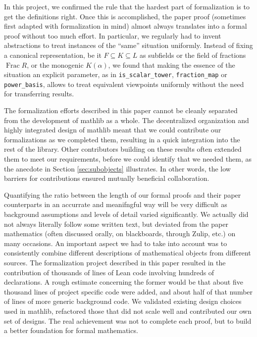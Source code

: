 \documentclass[a4paper,USenglish,cleveref, autoref, thm-restate]{lipics-v2021}
\newcommand{\lean}[1]{\texttt{#1}\xspace}
\newcommand{\mathlib}{\textsf{mathlib}\xspace}
\DeclareMathOperator{\Frac}{Frac}
\begin{document}
In this project, we confirmed the rule that the hardest part of formalization is to get the definitions right.
Once this is accomplished, the paper proof (sometimes first adapted with formalization in mind) almost always translates into a formal proof without too much effort.
In particular, we regularly had to invent abstractions to treat instances of the ``same'' situation uniformly.
Instead of fixing a canonical representation, be it $F \subseteq K \subseteq L$ as subfields or the field of fractions $\Frac R$, or the monogenic $K(\alpha)$, we found that making the essence of the situation an explicit parameter, as in \lean{is\_scalar\_tower}, \lean{fraction\_map} or \lean{power\_basis},
allows to treat equivalent viewpoints uniformly without the need for transferring results.

The formalization efforts described in this paper cannot be cleanly separated from the development of \mathlib as a whole.
The decentralized organization and highly integrated design of \mathlib meant that we could contribute our formalizations as we completed them, resulting in a quick integration into the rest of the library.
Other contributors building on these results often extended them to meet our requirements,
before we could identify that we needed them, as the anecdote in Section \ref{sec:subobjects} illustrates.
In other words, the low barriers for contributions ensured mutually beneficial collaboration.

Quantifying the ratio between the length of our formal proofs and their paper counterparts in an accurrate and meanifngful way will be very difficult as background assumptions and levels of detail varied significantly. We actually did not always literally follow some written text, but deviated from the paper mathematics (often discussed orally, on blackboards, through Zulip, etc.) on many occasions. An important aspect we had to take into account was to consistently combine different descriptions of mathematical objects from different sources.
The formalization project described in this paper resulted in the contribution of thousands of lines of Lean code involving hundreds of declarations.
A rough estimate concerning the former would be that about five thousand lines of project specific code were added, and about half of that number of lines of more generic background code.
We validated existing design choices used in \mathlib, refactored those that did not scale well
and contributed our own set of designs.
The real achievement was not to complete each proof,
but to build a better foundation for formal mathematics.



\end{document}
